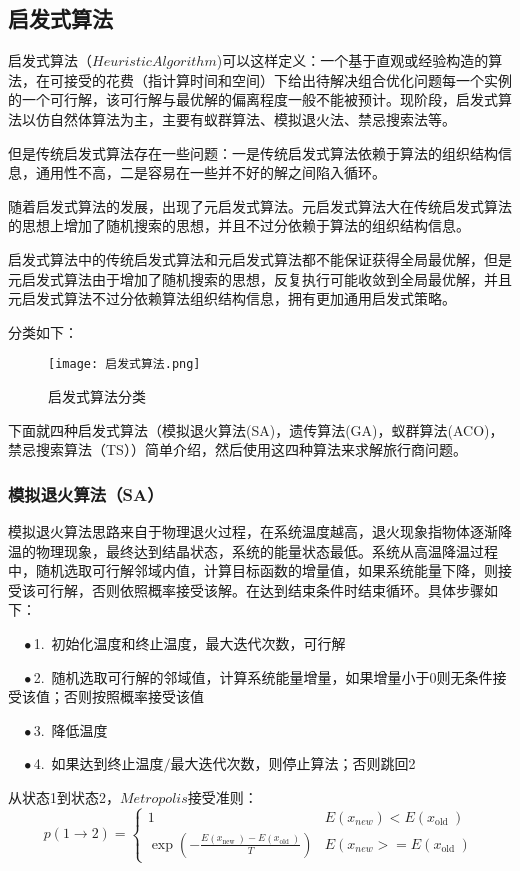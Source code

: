 \subsection{启发式算法}
\cite{burkard1998well}启发式算法（$Heuristic Algorithm$)可以这样定义：一个基于直观或经验构造的算法，在可接受的花费（指计算时间和空间）下给出待解决组合优化问题每一个实例的一个可行解，该可行解与最优解的偏离程度一般不能被预计。现阶段，启发式算法以仿自然体算法为主，主要有蚁群算法、模拟退火法、禁忌搜索法等。\cite{丛明煜2003现代启发式算法理论研究}

但是传统启发式算法存在一些问题：一是传统启发式算法依赖于算法的组织结构信息，通用性不高，二是容易在一些并不好的解之间陷入循环。

随着启发式算法的发展，出现了元启发式算法。元启发式算法大在传统启发式算法的思想上增加了随机搜索的思想，并且不过分依赖于算法的组织结构信息。

启发式算法中的传统启发式算法和元启发式算法都不能保证获得全局最优解，但是元启发式算法由于增加了随机搜索的思想，反复执行可能收敛到全局最优解，并且元启发式算法不过分依赖算法组织结构信息，拥有更加通用启发式策略。

分类如下：
\begin{figure}[hbt]
    \centering
    \texttt{[image: 启发式算法.png]}
    \caption{启发式算法分类}
    \label{chart_SA}
\end{figure}

下面就四种启发式算法（模拟退火算法(SA)，遗传算法(GA)，蚁群算法(ACO)，禁忌搜索算法（TS））简单介绍，然后使用这四种算法来求解旅行商问题。
\subsubsection{模拟退火算法（SA）}
\cite{bertsimas1993simulated}模拟退火算法思路来自于物理退火过程，在系统温度越高，退火现象指物体逐渐降温的物理现象，最终达到结晶状态，系统的能量状态最低。系统从高温降温过程中，随机选取可行解邻域内值，计算目标函数的增量值，如果系统能量下降，则接受该可行解，否则依照概率接受该解。在达到结束条件时结束循环。具体步骤如下：

$\quad \bullet$1.\ 初始化温度和终止温度，最大迭代次数，可行解

$\quad \bullet$2.\ 随机选取可行解的邻域值，计算系统能量增量，如果增量小于0则无条件接受该值；否则按照概率接受该值

$\quad \bullet$3.\ 降低温度

$\quad \bullet$4.\ 如果达到终止温度$/$最大迭代次数，则停止算法；否则跳回2

从状态1到状态2，$Metropolis$接受准则：
$$
p(1 \rightarrow 2)= \begin{cases}1 & E\left(x_{n e w}\right)<E\left(x_{\text {old }}\right) \\ \exp \left(-\frac{E\left(x_{\text {new }}\right)-E\left(x_{\text {old }}\right)}{T}\right) & E\left(x_{n e w}>=E\left(x_{\text {old }}\right)\right.\end{cases}
$$

